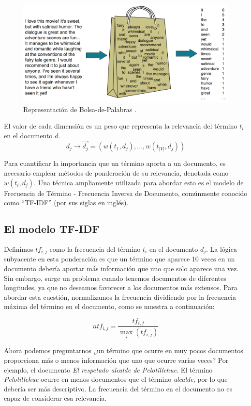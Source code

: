 \begin{figure}[h!]
\centering
\includegraphics[scale = 0.22]{pics/bow.png}
\caption{Representación de Bolsa-de-Palabras \cite{JurafskyBook}.}
\label{fig_bow}
\end{figure}




El valor de cada dimensión es un peso que representa la relevancia del término $t_{i}$ en el documento $d$.
\begin{equation}
d_{j} \rightarrow \overrightarrow{d_{j}}=(w(t_{1},d_{j}),...,w(t_{|V|},d_{j}))
\end{equation}

Para cuantificar la importancia que un término aporta a un documento, es necesario emplear métodos de ponderación de su relevancia, denotada como $w(t_{i},d_{j})$. Una técnica ampliamente utilizada para abordar esto es el modelo de Frecuencia de Término - Frecuencia Inversa de Documento, comúnmente conocido como ``TF-IDF'' (por sus siglas en inglés).

\subsection{El modelo TF-IDF}
Definimos $tf_{i,j}$ como la frecuencia del término $t_{i}$ en el documento $d_{j}$. La lógica subyacente en esta ponderación es que un término que aparece 10 veces en un documento debería aportar más información que uno que solo aparece una vez. Sin embargo, surge un problema cuando tenemos documentos de diferentes longitudes, ya que no deseamos favorecer a los documentos más extensos. Para abordar esta cuestión, normalizamos la frecuencia dividiendo por la frecuencia máxima del término en el documento, como se muestra a continuación:

\[
ntf_{i,j} = \frac{tf_{i,j}}{\max_i (tf_{i,j})}
\]

Ahora podemos preguntarnos ¿un término que ocurre en muy pocos documentos proporciona más o menos información que uno que ocurre varias veces? Por ejemplo, el documento \emph{El respetado alcalde de Pelotillehue}. El término \emph{Pelotillehue} ocurre en menos documentos que el término \emph{alcalde}, por lo que debería ser más descriptivo. La frecuencia del término en el documento no es capaz de considerar esa relevancia. 


